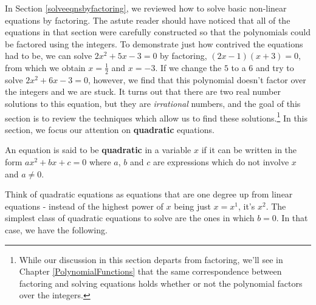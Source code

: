 \documentclass{ximera}
\begin{document}
	\author{Stitz-Zeager}




\setcounter{footnote}{0}

\label{AppQuadEqus}

In Section \ref{solveeqnsbyfactoring}, we reviewed how to solve basic non-linear equations by factoring.  The astute reader should have noticed that all of the equations in that section were carefully constructed so that the polynomials could be factored using the integers.  To demonstrate just how contrived the equations had to be, we can solve $2x^2+5x-3=0$ by factoring, $(2x-1)(x+3) = 0$, from which we obtain $x = \frac{1}{2}$ and $x = -3$.  If we change the $5$ to a $6$ and try to solve $2x^2 + 6x - 3 = 0$, however, we find that this polynomial doesn't factor over the integers and we are stuck.  It turns out that there are two real number solutions to this equation, but they are \textit{irrational} numbers, and the goal of this section is to review the techniques which allow us to find these solutions.\footnote{While our discussion in this section departs from factoring, we'll see in Chapter \ref{PolynomialFunctions} that the same correspondence between factoring and solving equations holds whether or not the polynomial factors over the integers.}  In this section, we focus our attention on \textbf{quadratic} equations.

\medskip


\begin{definition}\label{quadeqndefn} An equation is said to be \textbf{quadratic} in a variable $x$ if it can be written in the form $ax^2 + bx + c = 0$ where $a$, $b$ and $c$ are expressions which do not involve $x$ and $a \neq 0$.

\end{definition}


\medskip

Think of quadratic equations as equations that are one degree up from linear equations - instead of the highest power of $x$ being just $x = x^1$, it's $x^2$.  The simplest class of quadratic equations to solve are the ones in which $b = 0$.  In that case, we have the following.

\medskip

\label{extractingthesquareroot}
\end{document}
